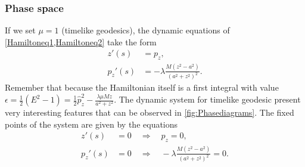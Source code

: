  
\subsubsection{Phase space}

If we set $\mu=1$ (timelike geodesics), the dynamic equations of \cref{Hamiltoneq1,Hamiltoneq2} take the form
\begin{align}
 z'(s)&= p_z , \\
 p_z'(s)&=-\lambda \frac{M \left(z^2-a^2\right)}{\left(a^2+z^2\right)^2}.
\end{align}
Remember that because the Hamiltonian itself is a first integral with value $\epsilon=\frac{1}{2}(E^2-1)=\frac{1}{2} \hat{p}_z^2 -\frac{ \lambda  \mu  M z}{a^2+z^2}$. The dynamic system for timelike geodesic present very interesting features that can be observed in \cref{fig:Phasediagrams}. The fixed points of the system are given by the equations
\begin{align}
  z'(s)&= 0 \quad \Longrightarrow \quad p_z=0,\\
  p_z'(s)&=0 \quad \Longrightarrow \quad -\lambda \frac{M \left(z^2-a^2\right)}{\left(a^2+z^2\right)^2}=0.
\end{align}
